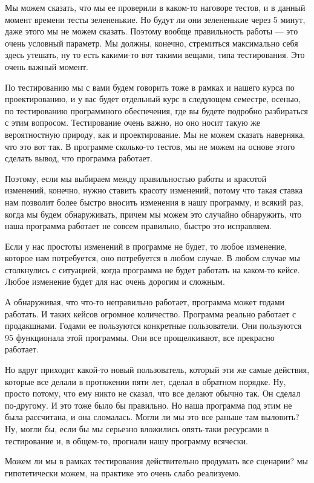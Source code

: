 Мы можем сказать, что мы ее проверили в каком-то наговоре тестов, и в данный момент времени тесты зелененькие. Но будут ли они зелененькие через 5 минут, даже этого мы не можем сказать. Поэтому вообще правильность работы --- это очень условный параметр. Мы должны, конечно, стремиться максимально себя здесь утешать, ну то есть какими-то вот такими вещами, типа тестирования. Это очень важный момент.

По тестированию мы с вами будем говорить тоже в рамках и нашего курса по проектированию, и у вас будет отдельный курс в следующем семестре, осенью, по тестированию программного обеспечения, где вы будете подробно разбираться с этим вопросом. Тестирование очень важно, но оно носит такую же вероятностную природу, как и проектирование. Мы не можем сказать наверняка, что это вот так. В программе сколько-то тестов,  мы не можем на основе этого сделать вывод, что программа работает.

Поэтому, если мы выбираем между правильностью работы и красотой изменений, конечно, нужно ставить красоту изменений, потому что такая ставка нам позволит более быстро вносить изменения в нашу программу, и всякий раз, когда мы будем обнаруживать, причем мы можем это случайно обнаружить, что наша программа работает не совсем правильно, быстро это исправляем.

Если у нас простоты изменений в программе не будет, то любое изменение, которое нам потребуется, оно потребуется в любом случае. В любом случае мы столкнулись с ситуацией, когда программа не будет работать на каком-то кейсе. Любое изменение будет для нас очень дорогим и сложным.

А обнаруживая, что что-то неправильно работает, программа может годами работать. И таких кейсов огромное количество. Программа реально работает с продакшнами. Годами ее пользуются конкретные пользователи. Они пользуются 95 функционала этой программы. Они все прощелкивают, все прекрасно работает.

Но вдруг приходит какой-то новый пользователь, который эти же самые действия, которые все делали в протяжении пяти лет, сделал в обратном порядке. Ну, просто потому, что ему никто не сказал, что все делают обычно так. Он сделал по-другому. И это тоже было бы правильно. Но наша программа под этим не была рассчитана, и она сломалась. Могли ли мы это все раньше там выловить? Ну, могли бы, если бы мы серьезно вложились опять-таки ресурсами в тестирование и, в общем-то, прогнали нашу программу всячески.

Можем ли мы в рамках тестирования действительно продумать все сценарии? мы гипотетически можем, на практике это очень слабо реализуемо.

